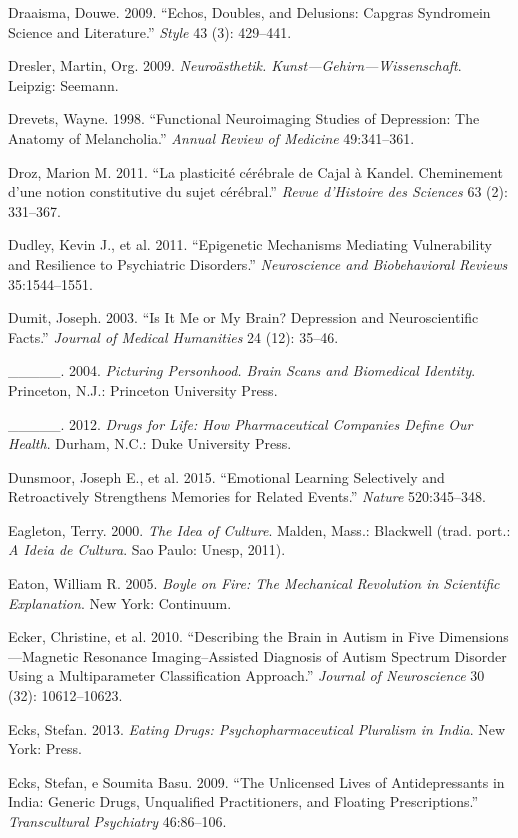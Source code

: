 {\begin{Parskip}
Draaisma, Douwe. 2009. ``Echos, Doubles, and Delusions: Capgras
Syndromein Science and Literature.'' \emph{Style} 43 (3): 429--441.

Dresler, Martin, Org. 2009. \emph{Neuroästhetik.
Kunst---Gehirn---Wissenschaft}. Leipzig: Seemann.

Drevets, Wayne. 1998. ``Functional Neuroimaging Studies of Depression:
The Anatomy of Melancholia.'' \emph{Annual Review of Medicine}
49:341--361.

Droz, Marion M. 2011. ``La plasticité cérébrale de Cajal à Kandel.
Cheminement d'une notion constitutive du sujet cérébral.'' \emph{Revue
d'Histoire des Sciences} 63 (2): 331--367.

Dudley, Kevin J., et al. 2011. ``Epigenetic Mechanisms Mediating
Vulnerability and Resilience to Psychiatric Disorders.''
\emph{Neuroscience and Biobehavioral Reviews} 35:1544--1551.

Dumit, Joseph. 2003. ``Is It Me or My Brain? Depression and
Neuroscientific Facts.'' \emph{Journal of Medical Humanities} 24 (12):
35--46.

\_\_\_\_\_. 2004. \emph{Picturing Personhood. Brain Scans and Biomedical
Identity}. Princeton, N.J.: Princeton University Press.

\_\_\_\_\_. 2012. \emph{Drugs for Life: How Pharmaceutical Companies
Define Our Health}. Durham, N.C.: Duke University Press.

Dunsmoor, Joseph E., et al. 2015. ``Emotional Learning Selectively and
Retroactively Strengthens Memories for Related Events.'' \emph{Nature}
520:345--348.

Eagleton, Terry. 2000. \emph{The Idea of Culture}. Malden, Mass.:
Blackwell (trad. port.: \emph{A Ideia de Cultura}. Sao Paulo: Unesp,
2011).

Eaton, William R. 2005. \emph{Boyle on Fire: The Mechanical Revolution
in Scientific Explanation}. New York: Continuum.

Ecker, Christine, et al. 2010. ``Describing the Brain in Autism in Five
Dimensions---Magnetic Resonance Imaging--Assisted Diagnosis of Autism
Spectrum Disorder Using a Multiparameter Classification Approach.''
\emph{Journal of Neuroscience} 30 (32): 10612--10623.

Ecks, Stefan. 2013. \emph{Eating Drugs: Psychopharmaceutical Pluralism
in India}. New York:  Press.

Ecks, Stefan, e Soumita Basu. 2009. ``The Unlicensed Lives of
Antidepressants in India: Generic Drugs, Unqualified Practitioners, and
Floating Prescriptions.'' \emph{Transcultural Psychiatry} 46:86--106.


\end{Parskip}}

